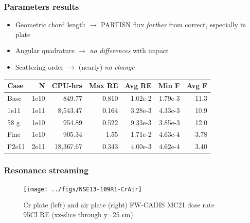 \documentclass[xcolor=x11names,compress]{beamer}
\renewcommand{\(}{\begin{columns}}
\renewcommand{\)}{\end{columns}}
\newcommand{\<}[1]{\begin{column}{#1}}
\renewcommand{\>}{\end{column}}
\begin{document}
\begin{frame}[fragile]
  \frametitle{Parameters results}
  
  	\begin{itemize}
  	\item Geometric chord length $\rightarrow$ PARTISN flux \textit{farther} from correct, especially in plate
  	\item Angular quadrature $\rightarrow$ \textit{no differences} with impact
	\item Scattering order $\rightarrow$ (nearly) \textit{no change}
  	\end{itemize}
  	\pause
  \begin{center}
    \begin{tabu}{|l|r|r|r|r|r|r|}\hline
      Case & N & CPU-hrs & Max RE & Avg RE & Min F & Avg F\\\hline
Base      & 1e10 & 849.77    & 0.810 & 1.02e-2 & 1.79e-3 & 11.3\\
%
1e11 & 1e11 & 8,543.47  & 0.164 & 3.28e-3 & \alert{4.33e-3} & 10.9\\
%
58 g & 1e10 & 954.89    & 0.522 & 9.33e-3 & \alert{3.85e-3} & 12.0\\
%
Fine & 1e10 & 905.34    & 1.55  & 1.71e-2 & 4.63e-4 & 3.78\\
%
F2e11 & 2e11 & 18,367.67 & 0.343 & 4.00e-3 & 4.62e-4 & 3.40\\\hline
    \end{tabu}
  \end{center}

\end{frame}


\begin{frame}[fragile]
  \frametitle{Resonance streaming}
   \begin{figure}[p]
   \begin{center}
     \texttt{[image: ../figs/NSE13-109R1-CrAir]}
   \end{center}
   \caption{Cr plate (left) and air plate (right) FW-CADIS MC21 dose rate 95CI RE (xz-slice through y=25 cm)}
   \label{fig:CrAir}
 \end{figure}
\end{frame}
\end{document}

